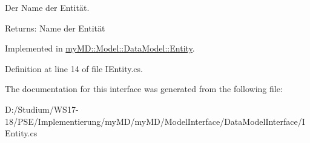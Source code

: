 Der Name der Entit\"{a}t. 

\begin{Desc}
\item[Returns:]Name der Entit\"{a}t\end{Desc}


Implemented in \hyperlink{classmy_m_d_1_1_model_1_1_data_model_1_1_entity_49ee3087348e8d44e1feda1917443987}{my\-MD::Model::Data\-Model::Entity}.

Definition at line 14 of file IEntity.cs.

The documentation for this interface was generated from the following file:\begin{CompactItemize}
\item 
D:/Studium/WS17-18/PSE/Implementierung/my\-MD/my\-MD/Model\-Interface/Data\-Model\-Interface/IEntity.cs\end{CompactItemize}
